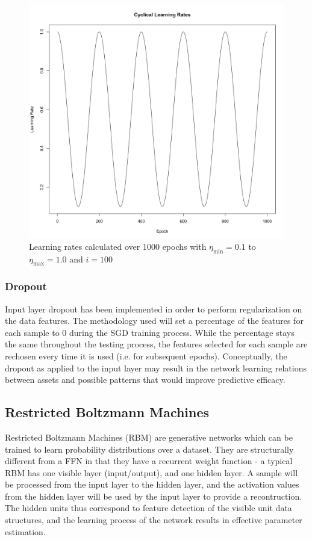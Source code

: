 \documentclass[a4paper,11pt,oneside]{article}
\theoremstyle{plain}
\theoremstyle{definition}
\begin{document}
\begin{figure}[H]
	\centering
	\includegraphics[scale=0.2]{images/implementation/CyclicalLearningRates.png}
	\caption{Learning rates calculated over 1000 epochs with $\eta_{\min} = 0.1$ to $\eta_{\max} = 1.0$ and $i=100$}
	\label{figure-SGDRLearningRates}
\end{figure}

\subsubsection{Dropout}

Input layer dropout has been implemented in order to perform regularization on the data features. The methodology used will set a percentage of the features for each sample to 0 during the SGD training process. While the percentage stays the same throughout the testing process, the features selected for each sample are rechosen every time it is used (i.e. for subsequent epochs). Conceptually, the dropout as applied to the input layer may result in the network learning relations between assets and possible patterns that would improve predictive efficacy.

\subsection{Restricted Boltzmann Machines}\label{imp_rbm}

Restricted Boltzmann Machines (RBM) are generative networks which can be trained to learn probability distributions over a dataset. They are structurally different from a FFN in that they have a recurrent weight function - a typical RBM has one visible layer (input/output), and one hidden layer. A sample will be processed from the input layer to the hidden layer, and the activation values from the hidden layer will be used by the input layer to provide a recontruction. The hidden units thus correspond to feature detection of the visible unit data structures, and the learning process of the network results in effective parameter estimation. \newline
\end{document}
